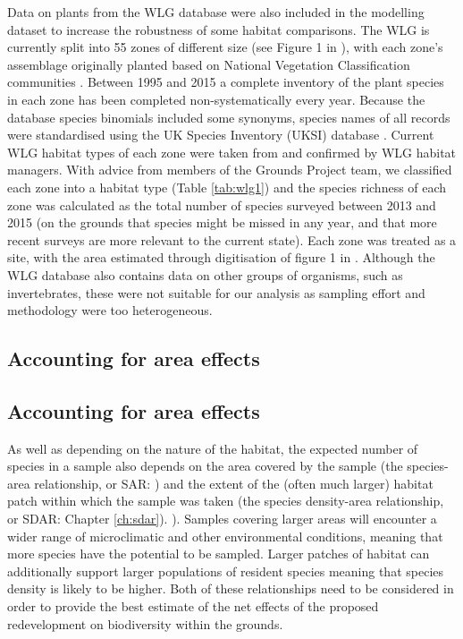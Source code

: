 Data on plants from the WLG database were also included in the modelling dataset to increase the robustness of some habitat comparisons. The WLG is currently split into 55 zones of different size (see Figure 1 in \citealt{Leigh:2003ln}), with each zone's assemblage originally planted based on National Vegetation Classification communities \citep{Honey:1999ln,Rodwell:1998nvc}. Between 1995 and 2015 a complete inventory of the plant species in each zone has been completed non-systematically every year. Because the database species binomials included some synonyms, species names of all records were standardised using the UK Species Inventory (UKSI) database \citep{Raper:2014wg}. Current WLG habitat types of each zone were taken from \citep{Leigh:2003ln} and confirmed by WLG habitat managers. With advice from members of the Grounds Project team, we classified each zone into a habitat type (Table \ref{tab:wlg1}) and the species richness of each zone was calculated as the total number of species surveyed between 2013 and 2015 (on the grounds that species might be missed in any year, and that more recent surveys are more relevant to the current state). Each zone was treated as a site, with the area estimated through digitisation of figure 1 in \cite{Leigh:2003ln}. Although the WLG database also contains data on other groups of organisms, such as invertebrates, these were not suitable for our analysis as sampling effort and methodology were too heterogeneous.

\ifappendixStyle %
\subsection{Accounting for area effects}%
\else
\subsection*{Accounting for area effects}
\fi
As well as depending on the nature of the habitat, the expected number of species in a sample also depends on the area covered by the sample (the species-area relationship, or SAR: \citealt{rosenzweig:1995species}) and the extent of the (often much larger) habitat patch within which the sample was taken (the species density-area relationship, or SDAR: 
\ifappendixStyle %
Chapter \ref{ch:sdar}). %
\else
\citealt{Phillips:2015sdar}). 
\fi
Samples covering larger areas will encounter a wider range of microclimatic and other environmental conditions, meaning that more species have the potential to be sampled. Larger patches of habitat can additionally support larger populations of resident species meaning that species density is likely to be higher. Both of these relationships need to be considered in order to provide the best estimate of the net effects of the proposed redevelopment on biodiversity within the grounds.

